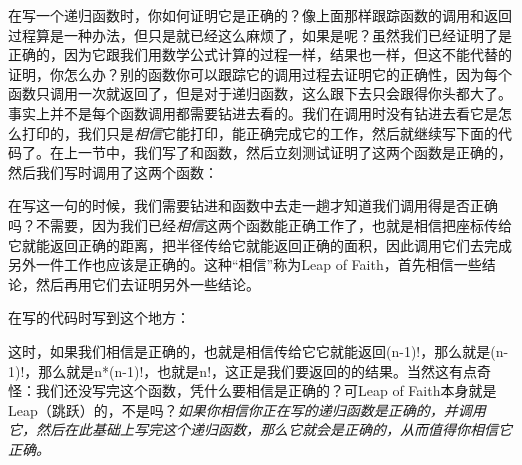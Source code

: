 在写一个递归函数时，你如何证明它是正确的？像上面那样跟踪函数的调用和返回过程算是一种办法，但只是就已经这么麻烦了，如果是呢？虽然我们已经证明了是正确的，因为它跟我们用数学公式计算的过程一样，结果也一样，但这不能代替的证明，你怎么办？别的函数你可以跟踪它的调用过程去证明它的正确性，因为每个函数只调用一次就返回了，但是对于递归函数，这么跟下去只会跟得你头都大了。事实上并不是每个函数调用都需要钻进去看的。我们在调用时没有钻进去看它是怎么打印的，我们只是\emph{相信}它能打印，能正确完成它的工作，然后就继续写下面的代码了。在上一节中，我们写了和函数，然后立刻测试证明了这两个函数是正确的，然后我们写时调用了这两个函数：




在写这一句的时候，我们需要钻进和函数中去走一趟才知道我们调用得是否正确吗？不需要，因为我们已经\emph{相信}这两个函数能正确工作了，也就是相信把座标传给它就能返回正确的距离，把半径传给它就能返回正确的面积，因此调用它们去完成另外一件工作也应该是正确的。这种“相信”称为Leap of Faith，首先相信一些结论，然后再用它们去证明另外一些结论。



在写的代码时写到这个地方：




这时，如果我们相信是正确的，也就是相信传给它它就能返回(n-1)!，那么就是(n-1)!，那么就是n*\BookSplit{}(n-1)!，也就是n!，这正是我们要返回的的结果。当然这有点奇怪：我们还没写完这个函数，凭什么要相信是正确的？可Leap of Faith本身就是Leap（跳跃）的，不是吗？\emph{如果你相信你正在写的递归函数是正确的，并调用它，然后在此基础上写完这个递归函数，那么它就会是正确的，从而值得你相信它正确。}



